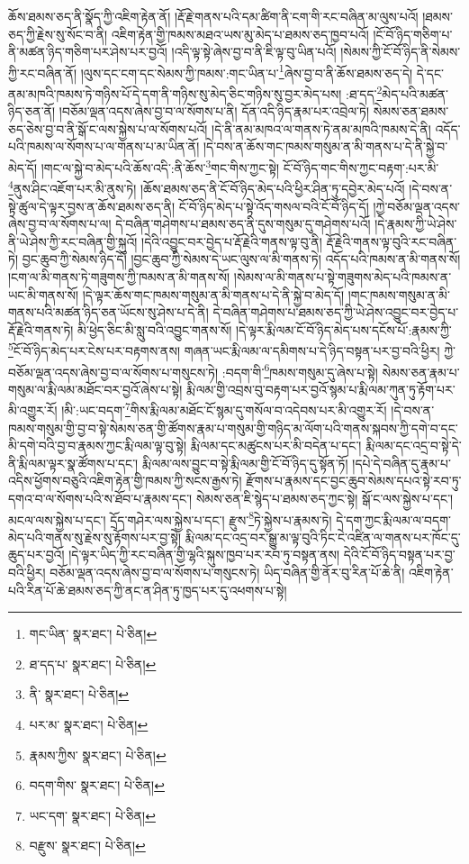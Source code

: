 ཆོས་ཐམས་ཅད་ནི་སྣོད་ཀྱི་འཇིག་རྟེན་ནོ། །རྡོ་རྗེ་གནས་པའི་དམ་ཚིག་ནི་ངག་གི་རང་བཞིན་མ་ལུས་པའོ། །ཐམས་ཅད་ཀྱི་རྗེས་སུ་སོང་བ་ནི། འཇིག་རྟེན་གྱི་ཁམས་མཐའ་ཡས་མུ་མེད་པ་ཐམས་ཅད་ཁྱབ་པའོ། །ངོ་བོ་ཉིད་གཅིག་པ་ནི་མཚན་ཉིད་གཅིག་པར་ཤེས་པར་བྱའོ། །འདི་ལྟ་སྟེ་ཞེས་བྱ་བ་ནི་ཇི་ལྟ་བུ་ཡིན་པའོ། །སེམས་ཀྱི་ངོ་བོ་ཉིད་ནི་སེམས་ཀྱི་རང་བཞིན་ནོ། །ལུས་དང་ངག་དང་སེམས་ཀྱི་ཁམས་:གང་ཡིན་པ་\footnote{གང་ཡིན་  སྣར་ཐང་།  པེ་ཅིན། }ཞེས་བྱ་བ་ནི་ཆོས་ཐམས་ཅད་དེ། དེ་དང་ནམ་མཁའི་ཁམས་ཏེ་གཉིས་པོ་དེ་དག་ནི་གཉིས་སུ་མེད་ཅིང་གཉིས་སུ་བྱར་མེད་པས། :ཐ་དད་\footnote{ཐ་དད་པ་  སྣར་ཐང་།  པེ་ཅིན། }མེད་པའི་མཚན་ཉིད་ཅན་ནོ། །བཅོམ་ལྡན་འདས་ཞེས་བྱ་བ་ལ་སོགས་པ་ནི། དོན་འདི་ཉིད་རྣམ་པར་འབྲེལ་ཏེ། སེམས་ཅན་ཐམས་ཅད་ཅེས་བྱ་བ་ནི་སྒོ་ང་ལས་སྐྱེས་པ་ལ་སོགས་པའོ། །དེ་ནི་ནམ་མཁའ་ལ་གནས་ཏེ་ནམ་མཁའི་ཁམས་དེ་ནི། འདོད་པའི་ཁམས་ལ་སོགས་པ་ལ་གནས་པ་མ་ཡིན་ནོ། །དེ་བས་ན་ཆོས་གང་ཁམས་གསུམ་ན་མི་གནས་པ་དེ་ནི་སྐྱེ་བ་མེད་དོ། །གང་ལ་སྐྱེ་བ་མེད་པའི་ཆོས་འདི་:ནི་ཆོས་\footnote{ནི་  སྣར་ཐང་།  པེ་ཅིན། }གང་གིས་ཀྱང་སྟེ། ངོ་བོ་ཉིད་གང་གིས་ཀྱང་བརྟག་:པར་མི་\footnote{པར་མ་  སྣར་ཐང་།  པེ་ཅིན། }ནུས་ཤིང་འཇོག་པར་མི་ནུས་ཏེ། །ཆོས་ཐམས་ཅད་ནི་ངོ་བོ་ཉིད་མེད་པའི་ཕྱིར་ཤིན་ཏུ་དབྱེར་མེད་པའོ། །དེ་བས་ན་སྟེ་ཚུལ་དེ་ལྟར་བྱས་ན་ཆོས་ཐམས་ཅད་ནི། ངོ་བོ་ཉིད་མེད་པ་སྟེ་འོད་གསལ་བའི་ངོ་བོ་ཉིད་དོ། །ཀྱེ་བཅོམ་ལྡན་འདས་ཞེས་བྱ་བ་ལ་སོགས་པ་ལ། དེ་བཞིན་གཤེགས་པ་ཐམས་ཅད་ནི་དུས་གསུམ་དུ་གཤེགས་པའོ། །དེ་རྣམས་ཀྱི་ཡེ་ཤེས་ནི་ཡེ་ཤེས་ཀྱི་རང་བཞིན་གྱི་སྐུའོ། །དེའི་འབྱུང་བར་བྱེད་པ་རྡོ་རྗེའི་གནས་ལྟ་བུ་ནི། རྡོ་རྗེའི་གནས་ལྟ་བུའི་རང་བཞིན་ཏེ། བྱང་ཆུབ་ཀྱི་སེམས་ཉིད་དོ། །བྱང་ཆུབ་ཀྱི་སེམས་དེ་ཡང་ལུས་ལ་མི་གནས་ཏེ། འདོད་པའི་ཁམས་ན་མི་གནས་སོ། །ངག་ལ་མི་གནས་ཏེ་གཟུགས་ཀྱི་ཁམས་ན་མི་གནས་སོ། །སེམས་ལ་མི་གནས་པ་སྟེ་གཟུགས་མེད་པའི་ཁམས་ན་ཡང་མི་གནས་སོ། །དེ་ལྟར་ཆོས་གང་ཁམས་གསུམ་ན་མི་གནས་པ་དེ་ནི་སྐྱེ་བ་མེད་དོ། །གང་ཁམས་གསུམ་ན་མི་གནས་པའི་མཚན་ཉིད་ཅན་ཡོངས་སུ་ཤེས་པ་དེ་ནི། དེ་བཞིན་གཤེགས་པ་ཐམས་ཅད་ཀྱི་ཡེ་ཤེས་འབྱུང་བར་བྱེད་པ་རྡོ་རྗེའི་གནས་ཏེ། མི་ཕྱེད་ཅིང་མི་སླུ་བའི་འབྱུང་གནས་སོ། །དེ་ལྟར་རྨི་ལམ་ངོ་བོ་ཉིད་མེད་པས་དངོས་པོ་:རྣམས་ཀྱི་\footnote{རྣམས་ཀྱིས་  སྣར་ཐང་།  པེ་ཅིན། }ངོ་བོ་ཉིད་མེད་པར་ངེས་པར་བརྟགས་ནས། གཞན་ཡང་རྨི་ལམ་ལ་དམིགས་པ་དེ་ཉིད་བསྟན་པར་བྱ་བའི་ཕྱིར། ཀྱེ་བཅོམ་ལྡན་འདས་ཞེས་བྱ་བ་ལ་སོགས་པ་གསུངས་ཏེ། :བདག་གི་\footnote{བདག་གིས་  སྣར་ཐང་།  པེ་ཅིན། }ཁམས་གསུམ་དུ་ཞེས་པ་སྟེ། སེམས་ཅན་རྣམ་པ་གསུམ་ལ་རྨི་ལམ་མཐོང་བར་བྱའོ་ཞེས་པ་སྟེ། རྨི་ལམ་གྱི་འབྲས་བུ་བརྟག་པར་བྱའོ་སྙམ་པ་རྨི་ལམ་ཀུན་ཏུ་རྟོག་པར་མི་འགྱུར་རོ། །མི་:ཡང་བདག་\footnote{ཡང་དག་  སྣར་ཐང་།  པེ་ཅིན། }གིས་རྨི་ལམ་མཐོང་ངོ་སྙམ་དུ་གསོལ་བ་འདེབས་པར་མི་འགྱུར་རོ། །དེ་བས་ན་ཁམས་གསུམ་གྱི་བྱ་བ་སྟེ་སེམས་ཅན་གྱི་ཚོགས་རྣམ་པ་གསུམ་གྱི་གཉིད་མ་ལོག་པའི་གནས་སྐབས་ཀྱི་དགེ་བ་དང་མི་དགེ་བའི་བྱ་བ་རྣམས་ཀྱང་རྨི་ལམ་ལྟ་བུ་སྟེ། རྨི་ལམ་དང་མཚུངས་པར་མི་བདེན་པ་དང་། རྨི་ལམ་དང་འདྲ་བ་སྟེ་དེ་ནི་རྨི་ལམ་ལྟར་སྣ་ཚོགས་པ་དང་། རྨི་ལམ་ལས་བྱུང་བ་སྟེ་རྨི་ལམ་གྱི་ངོ་བོ་ཉིད་དུ་སྟོན་ཏོ། །དཔེ་དེ་བཞིན་དུ་རྣམ་པ་འདིས་ཕྱོགས་བཅུའི་འཇིག་རྟེན་གྱི་ཁམས་ཀྱི་སངས་རྒྱས་ཏེ། རྫོགས་པ་རྣམས་དང་བྱང་ཆུབ་སེམས་དཔའ་སྟེ་རབ་ཏུ་དགའ་བ་ལ་སོགས་པའི་ས་ཐོབ་པ་རྣམས་དང་། སེམས་ཅན་ཇི་སྙེད་པ་ཐམས་ཅད་ཀྱང་སྟེ། སྒོ་ང་ལས་སྐྱེས་པ་དང་། མངལ་ལས་སྐྱེས་པ་དང་། དྲོད་གཤེར་ལས་སྐྱེས་པ་དང་། རྫུས་\footnote{བརྫུས་  སྣར་ཐང་།  པེ་ཅིན། }ཏེ་སྐྱེས་པ་རྣམས་ཏེ། དེ་དག་ཀྱང་རྨི་ལམ་ལ་བདག་མེད་པའི་གནས་སུ་རྗེས་སུ་རྟོགས་པར་བྱ་སྟེ། རྨི་ལམ་དང་འདྲ་བར་སྒྱུ་མ་ལྟ་བུའི་ཏིང་ངེ་འཛིན་ལ་གནས་པར་ཁོང་དུ་ཆུད་པར་བྱའོ། །དེ་ལྟར་ཡིད་ཀྱི་རང་བཞིན་གྱི་ལྷའི་སྐུས་ཁྱབ་པར་རབ་ཏུ་བསྟན་ནས། དེའི་ངོ་བོ་ཉིད་བསྟན་པར་བྱ་བའི་ཕྱིར། བཅོམ་ལྡན་འདས་ཞེས་བྱ་བ་ལ་སོགས་པ་གསུངས་ཏེ། ཡིད་བཞིན་གྱི་ནོར་བུ་རིན་པོ་ཆེ་ནི། འཇིག་རྟེན་པའི་རིན་པོ་ཆེ་ཐམས་ཅད་ཀྱི་ནང་ན་ཤིན་ཏུ་ཁྱད་པར་དུ་འཕགས་པ་སྟེ། 